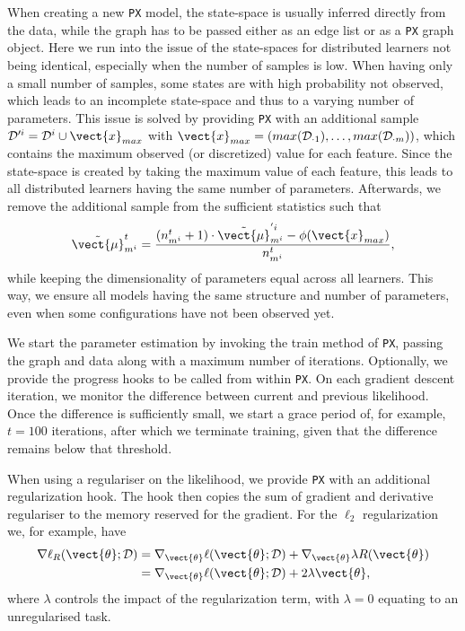 When creating a new \texttt{PX} model, the state-space is usually inferred directly from the data, while the graph has to be passed either as an edge list or as a \texttt{PX} graph object. 
Here we run into the issue of the state-spaces for distributed learners not being identical, especially when the number of samples is low. 
When having only a small number of samples, some states are with high probability not observed, which leads to an incomplete state-space and thus to a varying number of parameters. 
This issue is solved by providing \texttt{PX} with an additional sample $\mathcal{D}'^i = \mathcal{D}^i \cup \vect{x}_{max}$ with $\vect{x}_{max} = (max(\mathcal{D}_{\cdot 1}), \ldots, max(\mathcal{D}_{\cdot m}))$, which contains the maximum observed (or discretized) value for each feature.
Since the state-space is created by taking the maximum value of each feature, this leads to all distributed learners having the same number of parameters.
Afterwards, we remove the additional sample from the sufficient statistics such that
\begin{equation}
    \tilde{\vect{\mu}}^t_{m^i} = \frac{(n^t_{m^i} + 1) \cdot \tilde{\vect{\mu}}^{'i}_{m^i} - \phi(\vect{x}_{max})}{n^t_{m^{i}}},
\end{equation}
while keeping the dimensionality of parameters equal across all learners.
This way, we ensure all models having the same structure and number of parameters, even when some configurations have not been observed yet.

We start the parameter estimation by invoking the train method of \texttt{PX}, passing the graph and data along with a maximum number of iterations.
Optionally, we provide the progress hooks to be called from within \texttt{PX}.
On each gradient descent iteration, we monitor the difference between current and previous likelihood. 
Once the difference is sufficiently small, we start a grace period of, for example, $t=100$ iterations, after which we terminate training, given that the difference remains below that threshold.

When using a regulariser on the likelihood, we provide \texttt{PX} with an additional regularization hook. 
The hook then copies the sum of gradient and derivative regulariser to the memory reserved for the gradient.
For the $\ell_2$ regularization we, for example, have 
\begin{equation}
    \begin{split}
    \nabla \ell_R( \vect{\theta}; \mathcal{D}) &= \nabla_{\vect{\theta}} \ell( \vect{\theta}; \mathcal{D}) +  \nabla_{\vect{\theta}}\lambda R(\vect{\theta}) \\
    &=\nabla_{\vect{\theta}} \ell( \vect{\theta}; \mathcal{D}) +  2\lambda \vect{\theta},
    \end{split}
\end{equation} 
where $\lambda$ controls the impact of the regularization term, with $\lambda=0$ equating to an unregularised task.

